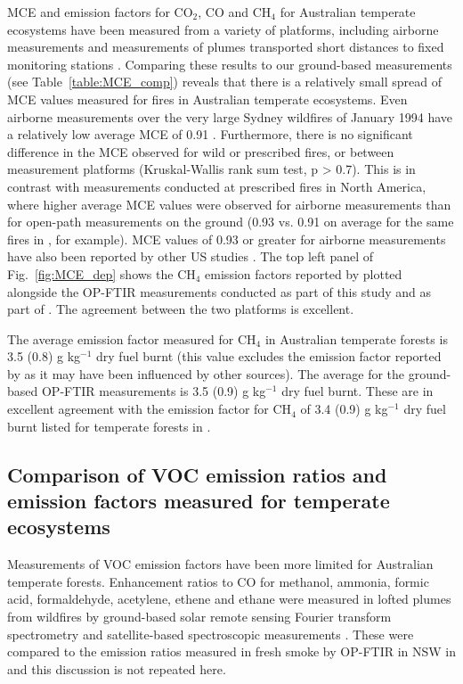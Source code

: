 \documentclass[acp, manuscript]{copernicus}
\begin{document}
MCE and emission factors for CO$_2$, CO and CH$_4$ for Australian temperate ecosystems have been measured from a variety of platforms, including airborne measurements \citep{Hurst1996} and measurements of plumes transported short distances to fixed monitoring stations \citep{Lawson2015,Rea2016}. Comparing these results to our ground-based measurements (see Table~\ref{table:MCE_comp}) reveals that there is a relatively small spread of MCE values measured for fires in Australian temperate ecosystems. Even airborne measurements over the very large Sydney wildfires of January 1994 have a relatively low average MCE of 0.91 \citep{Hurst1996}. Furthermore, there is no significant difference in the MCE observed for wild or prescribed fires, or between measurement platforms (Kruskal-Wallis rank sum test, p > 0.7). This is in contrast with measurements conducted at prescribed fires in North America, where higher average MCE values were observed for airborne measurements than for open-path measurements on the ground (0.93 vs. 0.91 on average for the same fires in \citet{Akagi2014}, for example). MCE values of 0.93 or greater for airborne measurements have also been reported by other US studies \citep{Burling2011, Akagi2013}. The top left panel of Fig.~\ref{fig:MCE_dep} shows the CH$_4$ emission factors reported by \citet{Hurst1996} plotted alongside the OP-FTIR measurements conducted as part of this study and as part of \citet{Paton-Walsh2014}. The agreement between the two platforms is excellent. 

The average emission factor measured for CH$_4$ in Australian temperate forests is 3.5 (0.8) g kg$^{-1}$ dry fuel burnt (this value excludes the emission factor reported by \citet{Rea2016} as it may have been influenced by other sources). The average for the ground-based OP-FTIR measurements is 3.5 (0.9) g kg$^{-1}$ dry fuel burnt. These are in excellent agreement with the emission factor for CH$_4$  of 3.4 (0.9) g kg$^{-1}$ dry fuel burnt listed for temperate forests in  \citet[Table S4, February 2015 update]{Akagi2011}. 

\subsection{Comparison of VOC emission ratios and emission factors measured for temperate ecosystems}
Measurements of VOC emission factors have been more limited for Australian temperate forests. Enhancement ratios to CO for methanol, ammonia, formic acid, formaldehyde, acetylene, ethene and ethane were measured in lofted plumes from wildfires by ground-based solar remote sensing Fourier transform spectrometry \citep{Paton-Walsh2005, Paton-Walsh2008} and satellite-based spectroscopic measurements \citep{Young2011,Glatthor2013}. These were compared to the emission ratios measured in fresh smoke by OP-FTIR in NSW in \citet{Paton-Walsh2014} and this discussion is not repeated here. 
 
\end{document}
